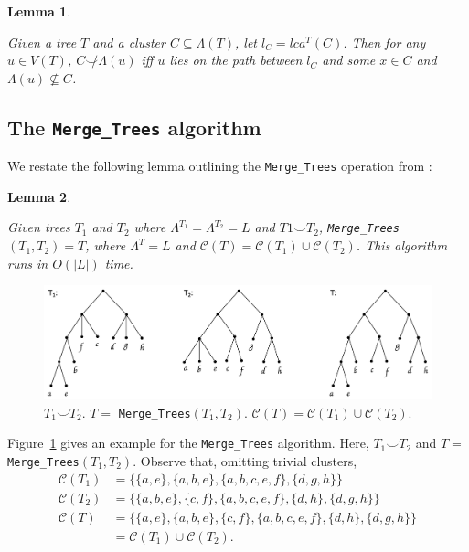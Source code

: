 \documentclass{article}
\newcommand{\compatible}{\smile}
\newcommand{\leafset}{\Lambda}
\newtheorem{incompatibility}{Lemma}
\newtheorem{mergetrees}[incompatibility]{Lemma}
\begin{document}
    \begin{incompatibility}
        \label{lem:incompatibility}

        Given a tree $T$ and a cluster $C \subseteq \leafset(T)$, let $l_C = lca^T(C)$. Then for any $u \in V(T)$, $C \not\compatible \leafset(u)$ iff $u$ lies on the path between $l_C$ and some $x \in C$ and $\leafset(u) \not\subseteq C$.
    \end{incompatibility}

    \subsection{The \texttt{Merge\_Trees} algorithm}
    \label{subsec:mergetrees}

    We restate the following lemma outlining the \texttt{Merge\_Trees} operation from \cite{jansson2016improved}:
    \newline

    \begin{mergetrees}
        \label{lem:mergetrees}

        Given trees $T_1$ and $T_2$ where $\leafset^{T_1} = \leafset^{T_2} = L$ and $T1 \compatible T_2$, \texttt{Merge\_Trees}$(T_1, T_2) = T$, where $\leafset^T = L$ and $\mathcal{C}(T) = \mathcal{C}(T_1) \cup \mathcal{C}(T_2)$. This algorithm runs in $O(|L|)$ time.
    \end{mergetrees}

    \begin{figure}[h]
        \includegraphics[scale=0.5]{mergetrees}
        \centering
        \caption{$T_1 \compatible T_2$. $T =$ \texttt{Merge\_Trees}$(T_1, T_2)$. $\mathcal{C}(T) = \mathcal{C}(T_1) \cup \mathcal{C}(T_2)$.}
        \label{fig:mergetrees}
    \end{figure}

    Figure~\ref{fig:mergetrees} gives an example for the \texttt{Merge\_Trees} algorithm. Here, $T_1 \compatible T_2$ and $T =$ \texttt{Merge\_Trees}$(T_1, T_2)$. Observe that, omitting trivial clusters,
    \begin{align*}
        \mathcal{C}(T_1) &= \{\{a, e\}, \{a, b, e\}, \{a, b, c, e, f\}, \{d, g, h\}\}\\
        \mathcal{C}(T_2) &= \{\{a, b, e\}, \{c, f\}, \{a, b, c, e, f\}, \{d, h\}, \{d, g, h\}\}\\
        \mathcal{C}(T) &= \{\{a, e\}, \{a, b, e\}, \{c, f\}, \{a, b, c, e, f\}, \{d, h\}, \{d, g, h\}\}\\
        &= \mathcal{C}(T_1) \cup \mathcal{C}(T_2).
    \end{align*}
\end{document}
